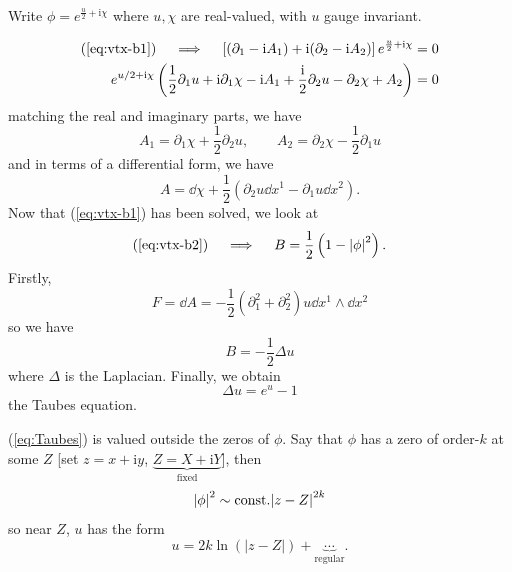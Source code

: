 \documentclass[a4paper,11pt]{article}
\begin{document}
    Write $\phi = e^{\frac{u}{2} + \mathrm{i} \chi}$ where $u, \chi$ are real-valued, with $u$ gauge invariant.

    \begin{equation}
        \begin{split}
            (\ref{eq:vtx-b1}) \quad \implies \quad \left[ (\partial_1 - \mathrm{i} A_1) + \mathrm{i}(\partial_2 - \mathrm{i} A_2) \right] e^{\frac{u}{2} + \mathrm{i} \chi} & = 0\\
            e^{u/2 + \mathrm{i} \chi} \left( \frac{1}{2} \partial_1 u + \mathrm{i} \partial_1 \chi - \mathrm{i} A_1 + \frac{\mathrm{i}}{2} \partial_2 u - \partial_2 \chi + A_2 \right) & = 0
        \end{split}
    \end{equation}
    matching the real and imaginary parts, we have 
    \begin{equation}
        A_1 = \partial_1 \chi + \frac{1}{2} \partial_2 u, \qquad A_2 = \partial_2 \chi - \frac{1}{2} \partial_1 u 
    \end{equation}
    and in terms of a differential form, we have 
    \begin{equation}
        A = \dd{\chi} + \frac{1}{2} \left( \partial_2 u \dd{x^1} - \partial_1 u \dd{x^2} \right).
    \end{equation}
    Now that (\ref{eq:vtx-b1}) has been solved, we look at 
    \begin{equation}
        (\ref{eq:vtx-b2}) \quad \implies \quad B = \frac{1}{2} \left( 1 - \abs{\phi}^2 \right).
    \end{equation}
    Firstly, 
    \begin{equation}
        F = \dd{A} = - \frac{1}{2} \left( \partial_1^2 + \partial_2^2 \right) u \dd{x^1} \wedge \dd{x^2}
    \end{equation}
    so we have 
    \begin{equation}
        B = - \frac{1}{2} \Delta u 
    \end{equation}
    where $\Delta$ is the Laplacian. Finally, we obtain 
    \begin{equation}
        \boxed{\Delta u = e^u - 1} \label{eq:Taubes}
    \end{equation}
    the Taubes equation.

    (\ref{eq:Taubes}) is valued outside the zeros of $\phi$. Say that $\phi$ has a zero of order-$k$ at some $Z$ [set $z = x+\mathrm{i}y$, $\underbrace{Z = X + \mathrm{i} Y}_{\text{fixed}}$], then 
    \begin{equation}
        \abs{\phi}^2 \sim \text{const.} \abs{z - Z}^{2k}
    \end{equation}
    so near $Z$, $u$ has the form 
    \begin{equation}
        u = 2k \ln \left( |z - Z| \right) + \underbrace{\cdots}_{\text{regular}}.
    \end{equation}
    
\end{document}
